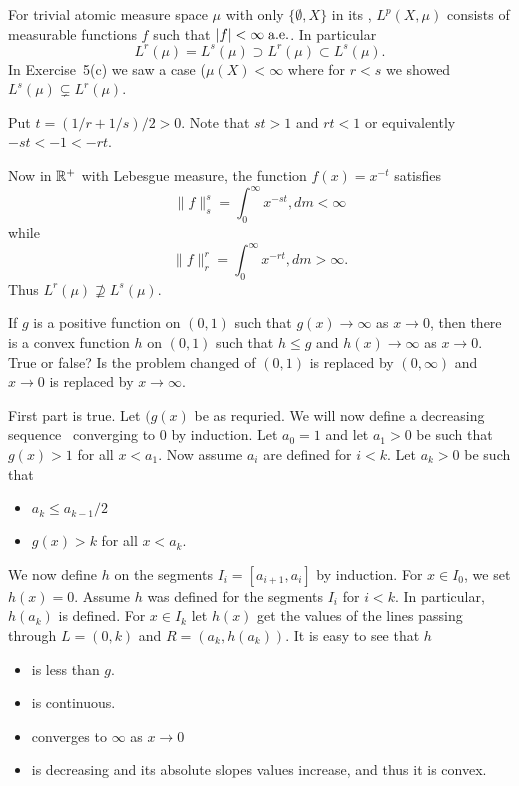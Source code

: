 \begin{enumerate}
For trivial atomic measure space \(\mu\) with only \(\{\emptyset,X\}\)
in its \salgebra, \(L^p(X,\mu)\) consists of measurable functions $f$
such that \(|f|<\infty \;\textrm{a.e.}\).
In particular
\begin{equation*}
L^r(\mu)=L^s(\mu)\supset L^r(\mu)\subset L^s(\mu).
\end{equation*}
In Exercise~5(c) we saw a case (\(\mu(X)<\infty\) where for \(r<s\) we showed
\(L^s(\mu) \subsetneq L^r(\mu)\).

Put \(t = (1/r+1/s)/2 > 0\).
Note that \(st>1\) and \(rt<1\) or equivalently \(-st < -1 < -rt\).

Now in \(\mathbb{R}^+\) with Lebesgue measure, the function \(f(x)=x^{-t}\) satisfies
\begin{equation*}
\|f\|_s^s = \int_0^\infty x^{-st},dm < \infty
\end{equation*}
while
\begin{equation*}
\|f\|_r^r = \int_0^\infty x^{-rt},dm > \infty.
\end{equation*}
Thus \(L^r(\mu) \nsupseteq L^s(\mu)\).


\begin{excopy}
 If $g$ is a positive function on \((0,1)\) such that
\(g(x)\to\infty\) as \(x\to 0\),
then there is a convex function $h$ on \((0,1)\) such that \(h\leq g\)
and
\(h(x)\to\infty\) as \(x\to 0\).
True or false?
Is the problem changed of \((0,1)\) is replaced by \((0,\infty)\)
and \(x\to 0\) is replaced by \(x\to\infty\).
\end{excopy}

First part is true.
Let \((g(x)\) be as requried. We will now define a decreasing sequence
\seqan\ converging to $0$ by induction.
Let \(a_0=1\) and
let \(a_1>0\) be such that \(g(x)>1\) for all \(x<a_1\).
Now assume \(a_i\) are defined for \(i<k\).
Let \(a_k > 0\) be such that
\begin{itemize}
 \item  \(a_k\leq a_{k-1}/2\)
 \item  \(g(x) > k\) for all \(x < a_k\).
\end{itemize}
We now define $h$ on the segments \(I_i = [a_{i+1},a_{i}]\) by induction.
For \(x\in I_0\), we set \(h(x)=0\).
Assume $h$ was defined for the segments \(I_i\) for \(i<k\).
In particular, \(h(a_k)\) is defined.
For \(x\in I_k\) let \(h(x)\) get the values of the lines passing
through \(L=(0,k)\) and \(R=(a_k,h(a_k))\).
It is easy to see that $h$
\begin{itemize}
 \item is less than $g$.
 \item is continuous.
 \item converges to \(\infty\) as \(x\to 0\)
 \item is decreasing and its absolute slopes values increase,
       and thus it is convex.
\end{itemize}


\end{enumerate}
